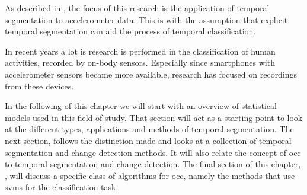 

As described in , the focus of this research is the application of temporal segmentation to accelerometer data.
This is with the assumption that explicit temporal segmentation can aid the process of temporal classification.


In recent years a lot is research is performed in the classification of human activities, recorded by on-body sensors.
Especially since smartphones with accelerometer sensors became more available, research has focused on recordings from these devices.


In the following of this chapter we will start with an overview of statistical models used in this field of study.
That section will act as a starting point to look at the different types, applications and methods of temporal segmentation.
The next section,  follows the distinction made and looks at a collection of temporal segmentation and change detection methods.
It will also relate the concept of \gls{occ} to temporal segmentation and change detection.
The final section of this chapter, , will discuss a specific class of algorithms for \gls{occ}, namely the methods that use \glspl{svm} for the classification task.

